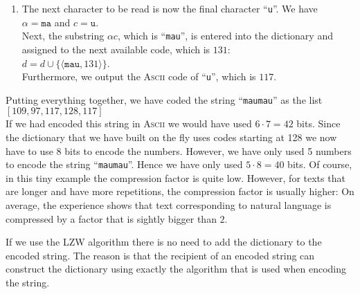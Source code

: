 \begin{enumerate}
\item The next character to be read is now the final character ``\texttt{u}''.  We have
      \\[0.2cm]
      \hspace*{1.3cm}
      $\alpha = \mathtt{ma}$ \quad and \quad $c = \mathtt{u}$.
      \\[0.2cm]
      Next, the substring $\alpha c$, which is ``\texttt{mau}'', is entered into the dictionary and
      assigned to the next available code, which is $131$:
      \\[0.2cm]
      \hspace*{1.3cm}
      $d = d \cup \{\langle \mathtt{mau}, 131 \rangle\}$.
      \\[0.2cm]
      Furthermore, we output the \textsc{Ascii} code of ``\texttt{u}'', which is $117$.
\end{enumerate} 
Putting everything together, we have coded the string ``\texttt{maumau}'' as the list
\\[0.2cm]
\hspace*{1.3cm}
$[109,97,117,128,117]$
\\[0.2cm]
If we had encoded this string in \textsc{Ascii} we would have used $6 \cdot 7 = 42$ bits.  Since the
dictionary that we have built on the fly uses codes starting at 128 we now have to use 8 bits to
encode the numbers.  However, we have only used 5 numbers to encode the string ``\texttt{maumau}''.
Hence we have only used $5 \cdot 8 = 40$ bits.   Of course, in this tiny example the compression
factor is quite low.  However, for texts that are longer and have more repetitions, the compression
factor is usually higher: On average, the experience shows that text corresponding to natural
language is compressed by a factor that is sightly bigger than $2$.

If we use the LZW algorithm there is no need to add the dictionary to the encoded string.  The
reason is that the recipient of an encoded string can construct the dictionary using exactly the
algorithm that is used when encoding the string.

